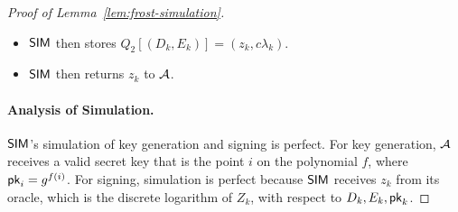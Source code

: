 \begin{proof}[Proof of Lemma~\ref{lem:frost-simulation}]
\begin{itemize}
\begin{enumerate}
  \item Checks if this signing session has not yet been opened, by if $(k, \ssid) \not\in W$,
  returning $\bot$ if the check holds.
\item Checks that $(k, \ssid, D_k, E_k) \in Q_1$ and $Q_2[(D_k, E_k)] = \bot$
    to ensure that they were indeed issued in Round 1 and have not yet been used,
    returning $\bot$ if the check does not hold.
  \item Otherwise, $\SIM$ follows the protocol honestly to derive each $a_i, i \in \coalition$,
  and then the group commitment
  $\aggR \gets \prod_{i \in \coalition} D_i \cdot {E_i}^{a_i}$
  and the challenge $c \gets \HashSig(\aggR, \threshpk, m)$.
  \item $\SIM$ then sets $Z_k \gets D_k \cdot E_k^{a_k} \cdot {\pk_k}^{c \lambda_k}$,
  and queries the \AOMDL oracle $\odlsol$ on $Z_k$ and
  coefficients $(\alpha, ( \beta_i)_{i \in \set{2\qsig + 1}})$,
  where each coefficient is zero,
  with these exceptions;
  $\alpha = c \lambda_k \cdot \sum_{i \in \corrupt} \sk_i L_i'(k)$,
  and $(\beta_0 = c \lambda_k \cdot L_0'(k), \beta_\gamma = 1, \beta_{\gamma+1} = a_i)$.
  Here, $(\gamma, \gamma+1)$ corresponds to the \AOMDL challenges $(D_k=X_\gamma, E_k=X_{\gamma+1})$ for this signing query,
  where $L_i'$ is the Lagrange polynomial for $i \in \corrupt$ associated with the set $\{ 0\} \cup \corrupt$,
      such that $\pk_k^c = \pk^{L_0'(k) c} \cdot g^{c \alpha}$.
  \item $\SIM$ then receives $z_k$ in return from its \AOMDL oracle,
    which is the discrete logarithm of $Z_k$.
  \end{enumerate}
  \item $\SIM$ then stores $Q_2[(D_k, E_k)] = (z_k, c \lambda_k)$.
  \item $\SIM$ then returns $z_k$ to $\mathcal{A}$.
  \end{itemize}

  \medskip

  \paragraph{Analysis of Simulation.}
	$\SIM$'s simulation of key generation and signing is perfect.
  For key generation,
  $\mathcal{A}$ receives a valid secret key that is the point $i$ on the polynomial $f$,
  where $\mathsf{pk}_i = g^{f(i)}$.
  For signing, simulation is perfect because $\SIM$ receives $z_k$ from its \AOMDL oracle,
  which is the discrete logarithm of $Z_k$,
  with respect to $D_k, E_k, \mathsf{pk}_k$.



\end{proof}
